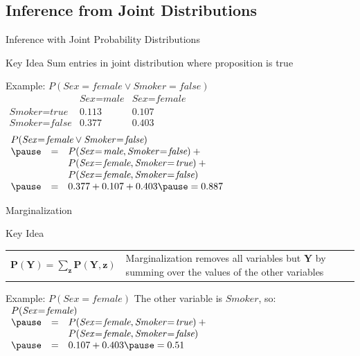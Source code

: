 \documentclass[14pt]{beamer}
\begin{document}
\subsection{Inference from Joint Distributions}
\begin{frame}{Inference with Joint Probability Distributions}
	\begin{block}{Key Idea}
		Sum entries in joint distribution where proposition is true
	\end{block}
	\pause
	\begin{block}{Example: $P(\textit{Sex}\!=\!\textit{female} \lor \textit{Smoker}\!=\!\textit{false})$}
		\tab\tab
		$
		\begin{array}{lcc}
			                           & \textit{Sex}\!=\!\textit{male} & \textit{Sex}\!=\!\textit{female} \\
			\textit{Smoker}\!=\!\textit{true}  & 0.113                  & 0.107 \\
			\textit{Smoker}\!=\!\textit{false} & 0.377                  & 0.403 \\
		\end{array}
		$
		\\ \medskip
		\pause
		$
		\begin{array}{lll}
			\lefteqn{P(\textit{Sex}\!=\!\textit{female} \lor \textit{Smoker}\!=\!\textit{false})} \\
			\pause
			& = & P(\textit{Sex}\!=\!\textit{male},\textit{Smoker}\!=\!\textit{false}) + \mbox{}\\
			&   & P(\textit{Sex}\!=\!\textit{female},\textit{Smoker}\!=\!\textit{true}) + \mbox{}\\
			&   & P(\textit{Sex}\!=\!\textit{female},\textit{Smoker}\!=\!\textit{false})\\
			\pause
			& = & 0.377 + 0.107 + 0.403 \pause = 0.887
		\end{array}
		$
	\end{block}
\end{frame}
\begin{frame}{Marginalization}
	\begin{block}{Key Idea}
		\begin{tabular}{lm{2.5in}}
			$
			\mathbf{P}(\mathbf{Y})
				= \sum\limits_{\mathbf{z}}{\mathbf{P}(\mathbf{Y}, \mathbf{z})}
			$
			&
			\alert{Marginalization} removes all variables but $\mathbf{Y}$ by summing over the values of the other variables
		\end{tabular}
	\end{block}
	\pause
	\begin{block}{Example: $P(\textit{Sex}\!=\!\textit{female})$}
		The other variable is $\textit{Smoker}$, so: \\[.5em]
		$
		\begin{array}{lll}
			\lefteqn{P(\textit{Sex}\!=\!\textit{female})} \\
			\pause & = & P(\textit{Sex}\!=\!\textit{female},\textit{Smoker}\!=\!\textit{true}) + \mbox{}\\
			       &   & P(\textit{Sex}\!=\!\textit{female},\textit{Smoker}\!=\!\textit{false})\\
			\pause & = & 0.107 + 0.403 \pause = 0.51
		\end{array}
		$
	\end{block}
\end{frame}
\end{document}
